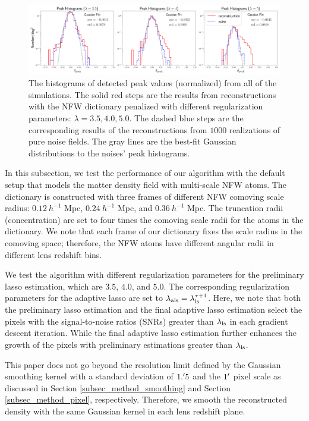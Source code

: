 \begin{figure}
 \centering
 \includegraphics[width=1.0\textwidth]{peak_histograms_NFW.pdf}
 \caption{The histograms of detected peak values (normalized) from all of the
     simulations.  The solid red steps are the results from reconstructions
     with the NFW dictionary penalized with different regularization
     parameters: $\lambda=3.5,4.0,5.0$. The dashed blue steps are the
     corresponding results of the reconstructions from $1000$ realizations of
     pure noise fields. The gray lines are the best-fit Gaussian distributions
     to the noises' peak histograms.
    }\label{fig_peakHist}
\end{figure}

In this subsection, we test the performance of our algorithm with the default
setup that models the matter density field with multi-scale NFW atoms. The
dictionary is constructed with three frames of different NFW comoving scale
radius: $0.12~h^{-1}$ Mpc, $0.24~h^{-1}$ Mpc, and $0.36~h^{-1}$ Mpc.  The
truncation radii (concentration) are set to four times the comoving scale radii
for the atoms in the dictionary. We note that each frame of our dictionary
fixes the scale radius in the comoving space; therefore, the NFW atoms have
different angular radii in different lens redshift bins.

We test the algorithm with different regularization parameters for the
preliminary lasso estimation, which are $3.5$, $4.0$, and $5.0$. The
corresponding regularization parameters for the adaptive lasso are set to
$\lambda_{\rm{als}}=\lambda_{\rm{ls}}^{\tau+1}$.  Here, we note that both the
preliminary lasso estimation and the final adaptive lasso estimation select the
pixels with the signal-to-noise ratios (SNRs) greater than $\lambda_{\rm{ls}}$
in each gradient descent iteration. While the final adaptive lasso estimation
further enhances the growth of the pixels with preliminary estimations greater
than $\lambda_{\rm{ls}}$.

This paper does not go beyond the resolution limit defined by the Gaussian
smoothing kernel with a standard deviation of $1.\mbox{$^\prime$} 5$ and the $1\mbox{$^\prime$}$
pixel scale as discussed in Section \ref{subsec_method_smoothing} and Section
\ref{subsec_method_pixel}, respectively.  Therefore, we smooth the
reconstructed density with the same Gaussian kernel in each lens redshift
plane.


